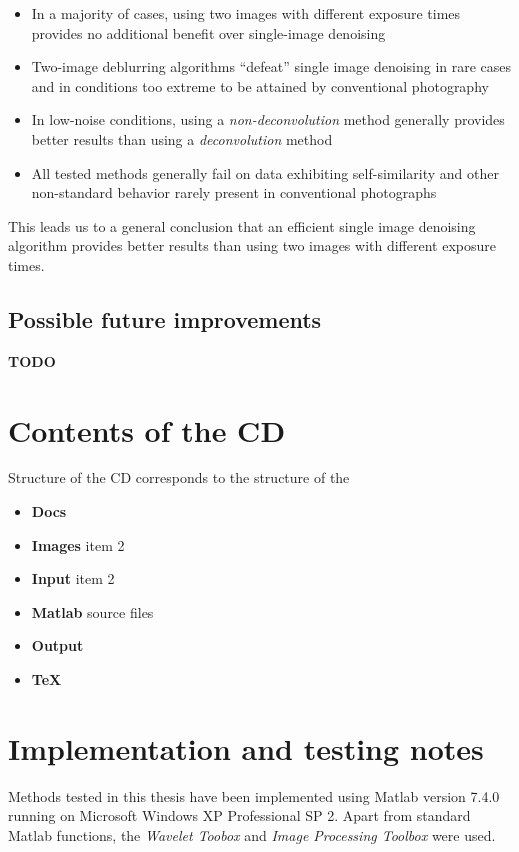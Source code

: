 \documentclass[12pt,notitlepage]{report}
\begin{document}
\begin{itemize}
\item In a majority of cases, using two images with different exposure times provides no additional benefit over single-image denoising
\item Two-image deblurring algorithms “defeat” single image denoising in rare cases and in conditions too extreme to be attained by conventional photography
\item In low-noise conditions, using a {\em non-deconvolution} method generally provides better results than using a {\em deconvolution} method
\item All tested methods generally fail on data exhibiting self-similarity and other non-standard behavior rarely present in conventional photographs
\end{itemize}

This leads us to a general conclusion that an efficient single image denoising algorithm provides better results than using two images with different exposure times. 

\section{Possible future improvements}

\textbf{TODO}

\appendix

\chapter{Contents of the CD}

Structure of the CD corresponds to the structure of the 

\begin{itemize}
	\item \textbf{Docs}
	\item \textbf{Images} item 2
	\item \textbf{Input} item 2
	\item \textbf{Matlab} source files
	\item \textbf{Output}
	\item \textbf{TeX} 
\end{itemize} 

\chapter{Implementation and testing notes}
\label{chap:notes}

Methods tested in this thesis have been implemented using Matlab version 7.4.0 running on Microsoft Windows XP Professional SP 2. Apart from standard Matlab functions, the {\em Wavelet Toobox} and {\em Image Processing Toolbox} were used.
\end{document}
